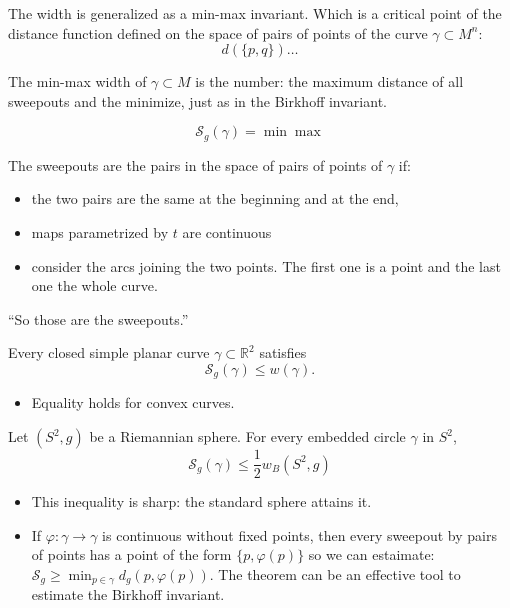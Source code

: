 \noindent
The width is generalized as a min-max
invariant.
Which is a critical point of the distance
function defined on the space of pairs of
points of the curve $\gamma \subset M^n$:
$$
d(\{p,q\})…
$$

The min-max width of $\gamma \subset M$ is
the number: the maximum distance of all
sweepouts and the minimize, just as in the
Birkhoff invariant.

$$
\mathcal{S}_g(\gamma)
=\operatorname{min} \operatorname{max}
$$


The sweepouts are the pairs in the space of
pairs of points of $\gamma$ if:
\begin{itemize}
\item the two pairs are the same at the
beginning and at the end,
\item maps parametrized by $t$ are
continuous
\item consider the arcs joining the two
points. The first one is a point and the
last one the whole curve.
\end{itemize}

\noindent
``So those are the sweepouts.''

\begin{theorem}
\label{theorem-amm}
Every closed simple planar curve $\gamma
\subset \mathbb{R}^2$ satisfies
$$
\mathcal{S}_g(\gamma) \leq  w (\gamma).
$$
\end{theorem}

\begin{itemize}
\item Equality holds for convex curves.
\end{itemize}

\begin{theorem}
\label{theorem-amm2}
Let $(S^2,g)$ be a Riemannian sphere. For every
embedded circle $\gamma$ in $S^2$,
$$
\mathcal{S}_g (\gamma) \leq 
\frac{1}{2}w_B(S^2,g)
$$
\end{theorem}


\begin{itemize}
\item This inequality is sharp: the standard
sphere attains it.
\item If $\varphi:\gamma \to \gamma$
is continuous without fixed points,
then every sweepout by pairs of points has a
point of the form $\{p , \varphi(p)\}$
so we can estaimate: $\mathcal{S}_g \geq
\operatorname{min}_{p \in \gamma} d_g(p ,
\varphi(p))$.
The theorem can be an effective tool to
estimate the Birkhoff invariant.
\end{itemize}

